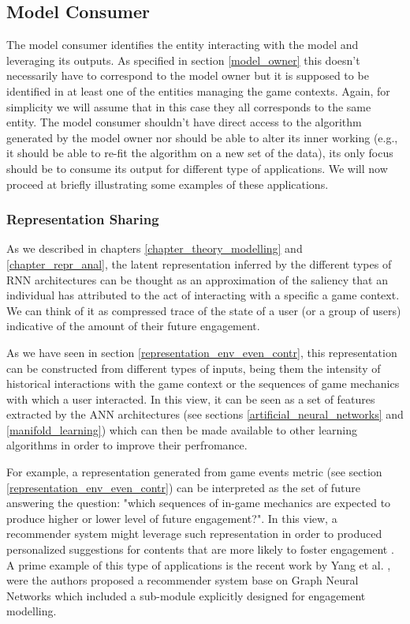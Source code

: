 \subsection{Model Consumer}
\label{model_consumer}
The model consumer identifies the entity interacting with the model and leveraging its outputs. As specified in section \ref{model_owner} this doesn't necessarily have to correspond to the model owner but it is supposed to be identified in at least one of the entities managing the game contexts. Again, for simplicity we will assume that in this case they all corresponds to the same entity. The model consumer shouldn't have direct access to the algorithm generated by the model owner nor should be able to alter its inner working (e.g., it should be able to re-fit the algorithm on a new set of the data), its only focus should be to consume its output for different type of applications. We will now proceed at briefly illustrating some examples of these applications.

\subsubsection{Representation Sharing}
\label{represenation_sharing}
As we described in chapters \ref{chapter_theory_modelling} and \ref{chapter_repr_anal}, the latent representation inferred by the different types of RNN architectures can be thought as an approximation of the saliency that an individual has attributed to the act of interacting with a specific a game context. We can think of it as compressed trace of the state of a user (or a group of users) indicative of the amount of their future engagement. 

As we have seen in section \ref{representation_env_even_contr}, this representation can be constructed from different types of inputs, being them the intensity of historical interactions with the game context or the sequences of game mechanics with which a user interacted. In this view, it can be seen as a set of features extracted by the ANN architectures (see sections \ref{artificial_neural_networks} and \ref{manifold_learning}) which can then be made available to other learning algorithms in order to improve their perfromance. 

For example, a representation generated from game events metric (see section \ref{representation_env_even_contr}) can be interpreted as the set of future answering the question: "which sequences of in-game mechanics are expected to produce higher or lower level of future engagement?". In this view, a recommender system might leverage such representation in order to produced personalized suggestions for contents that are more likely to foster engagement \cite{bertens2018machine}. A prime example of this type of applications is the recent work by Yang et al. \cite{yang2022large}, were the authors proposed a recommender system base on Graph Neural Networks which included a sub-module explicitly designed for engagement modelling. 

